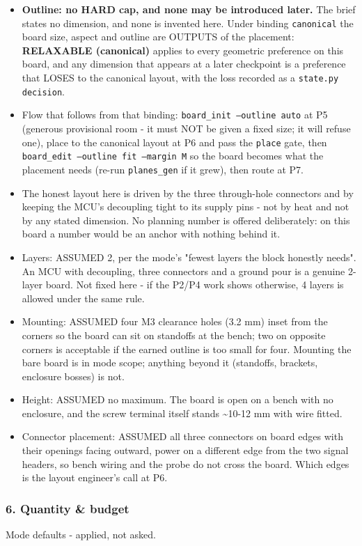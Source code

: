 \documentclass[11pt,a4paper]{article}
\begin{document}
\begin{itemize}
\item \textbf{Outline: no HARD cap, and none may be introduced later.} The brief
states no dimension, and none is invented here. Under binding \texttt{canonical}
the board size, aspect and outline are OUTPUTS of the placement:
\textbf{RELAXABLE (canonical)} applies to every geometric preference on this
board, and any dimension that appears at a later checkpoint is a preference
that LOSES to the canonical layout, with the loss recorded as a
\texttt{state.py decision}.
\item Flow that follows from that binding: \texttt{board\_init --outline auto} at P5
(generous provisional room - it must NOT be given a fixed size; it will
refuse one), place to the canonical layout at P6 and pass the \texttt{place} gate,
then \texttt{board\_edit --outline fit --margin M} so the board becomes what the
placement needs (re-run \texttt{planes\_gen} if it grew), then route at P7.
\item The honest layout here is driven by the three through-hole connectors and
by keeping the MCU's decoupling tight to its supply pins - not by heat and
not by any stated dimension. No planning number is offered deliberately:
on this board a number would be an anchor with nothing behind it.
\item Layers: ASSUMED 2, per the mode's "fewest layers the block honestly needs".
An MCU with decoupling, three connectors and a ground pour is a genuine
2-layer board. Not fixed here - if the P2/P4 work shows otherwise, 4 layers
is allowed under the same rule.
\item Mounting: ASSUMED four M3 clearance holes (3.2 mm) inset from the corners
so the board can sit on standoffs at the bench; two on opposite corners is
acceptable if the earned outline is too small for four. Mounting the bare
board is in mode scope; anything beyond it (standoffs, brackets, enclosure
bosses) is not.
\item Height: ASSUMED no maximum. The board is open on a bench with no enclosure,
and the screw terminal itself stands \textasciitilde{}10-12 mm with wire fitted.
\item Connector placement: ASSUMED all three connectors on board edges with their
openings facing outward, power on a different edge from the two signal
headers, so bench wiring and the probe do not cross the board. Which edges
is the layout engineer's call at P6.
\end{itemize}
\subsubsection*{6. Quantity \& budget}
Mode defaults - applied, not asked.
\end{document}
